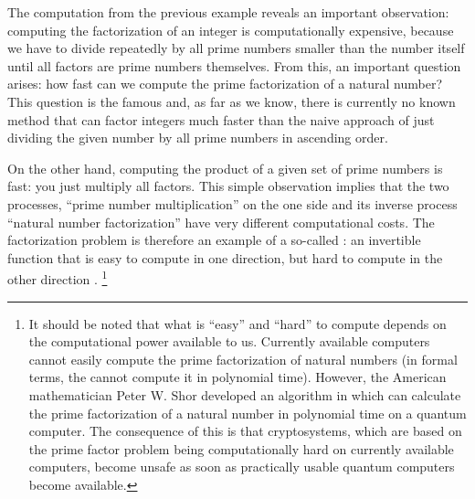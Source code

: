 The computation from the previous example reveals an important observation: computing the factorization of an integer is computationally expensive, because we have to divide repeatedly by all prime numbers smaller than the number itself until all factors are prime numbers themselves. From this, an important question arises: how fast can we compute the prime factorization of a natural number? This question is the famous  and, as far as we know, there is currently no known method that can factor integers much faster than the naive approach of just dividing the given number by all prime numbers in ascending order.

On the other hand, computing the product of a given set of prime numbers is fast: you just multiply all factors. This simple observation implies that the two processes, ``prime number multiplication'' on the one side and its inverse process ``natural number factorization'' have very different computational costs. The factorization problem is therefore an example of a so-called : an invertible function that is easy to compute in one direction, but hard to compute in the other direction 
. 
\footnote{It should be noted that what is ``easy'' and ``hard'' to compute depends on the computational power available to us. Currently available computers cannot easily compute the prime factorization of natural numbers (in formal terms, the cannot compute it in polynomial time). However, the American mathematician Peter W. Shor developed an algorithm in \citeyear{shor94} which can calculate the prime factorization of a natural number in polynomial time on a quantum computer. The consequence of this is that cryptosystems, which are based on the prime factor problem being computationally hard on currently available computers, become unsafe as soon as practically usable quantum computers become available.}


